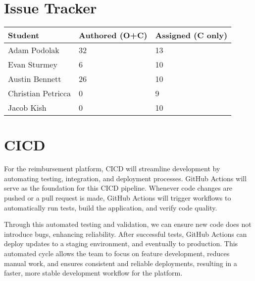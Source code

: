 \documentclass{article}
\begin{document}

\section{Issue Tracker}


\begin{table}[H]
\centering
\begin{tabular}{lll}
\toprule
\textbf{Student} & \textbf{Authored (O+C)} & \textbf{Assigned (C only)}\\
\midrule
Adam Podolak & 32 & 13 \\
Evan Sturmey & 6 & 10 \\
Austin Bennett & 26 & 10 \\
Christian Petricca & 0 & 9 \\
Jacob Kish & 0 & 10 \\
\bottomrule
\end{tabular}
\end{table}


\section{CICD}

For the reimbursement platform, CICD will streamline development by automating testing, integration, and deployment processes. GitHub Actions will serve as the foundation for this CICD pipeline. Whenever code changes are pushed or a pull request is made, GitHub Actions will trigger workflows to automatically run tests, build the application, and verify code quality.

Through this automated testing and validation, we can ensure new code does not introduce bugs, enhancing reliability. After successful tests, GitHub Actions can deploy updates to a staging environment, and eventually to production. This automated cycle allows the team to focus on feature development, reduces manual work, and ensures consistent and reliable deployments, resulting in a faster, more stable development workflow for the platform.


\end{document}
